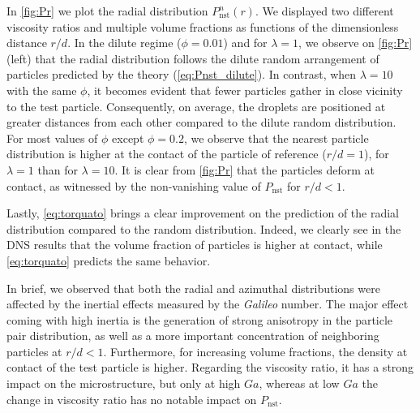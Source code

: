 In \ref{fig:Pr}  we plot the radial distribution $P_\text{nst}^n(r)$. %
We displayed two different viscosity ratios and multiple volume fractions as functions of the dimensionless distance $r/d$. 
In the dilute regime ($\phi = 0.01$) and for $\lambda=1$, we observe on \ref{fig:Pr} (left) that the radial distribution follows the dilute random arrangement of particles predicted by the theory (\ref{eq:Pnst_dilute}). 
In contrast, when $\lambda = 10$ with the same $\phi$, it becomes evident that fewer particles gather in close vicinity to the test particle. Consequently, on average, the droplets are positioned at greater distances from each other compared to the dilute random distribution. 
For most values of $\phi$ except $\phi=0.2$, we observe that the nearest particle distribution is higher at the contact of the particle of reference ($r/d = 1$), for $\lambda = 1$ than for $\lambda = 10$. 
It is clear from \ref{fig:Pr} that the particles deform at contact, as witnessed by the non-vanishing value of $P_\text{nst}$ for $r/d<1$.

Lastly, \ref{eq:torquato} brings a clear improvement on the prediction of the radial distribution compared to the random distribution. 
Indeed, we clearly see in the DNS results that the volume fraction of particles is higher at contact, while \ref{eq:torquato} predicts the same behavior. 


In brief, we observed that both the radial and azimuthal distributions were affected by the inertial effects measured by the \textit{Galileo} number. 
The major effect coming with high inertia is the generation of strong anisotropy in the particle pair distribution, as well as a more important concentration of neighboring particles at $r/d < 1$. 
Furthermore, for increasing volume fractions, the density at contact of the test particle is higher. 
Regarding the viscosity ratio, it has a strong impact on the microstructure, but only at high $Ga$, whereas at low $Ga$ the change in viscosity ratio has no notable impact on $P_\text{nst}$. 

